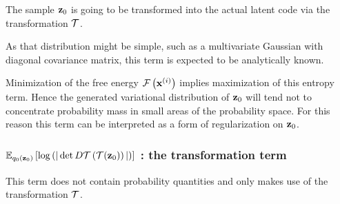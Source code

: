 The sample $\mathbf{z}_0$ is going to be transformed into
the actual latent code via the transformation $\mathcal{T}$.

As that distribution might be simple,
such as a multivariate Gaussian with diagonal covariance
matrix, this term is expected to be analytically known.

Minimization of the free energy $\mathcal{F}\left(\mathbf{x}^{(i)}\right)$ implies
maximization of this entropy term. 
Hence the generated variational distribution of $\mathbf{z}_0$
will tend not to concentrate probability mass
in small areas of the probability space.
For this reason this term can be interpreted as
a form of regularization on $\mathbf{z}_0$.

\subsubsection{$\mathbb{E}_{q_0\left(\mathbf{z}_0\right)}\left[ \log \left( |\det D\mathcal{T}\left(\mathcal{T}(\mathbf{z}_0)\right)| \right) \right]$ : the transformation term}

This term does not contain probability quantities and
only makes use of the transformation $\mathcal{T}$.

